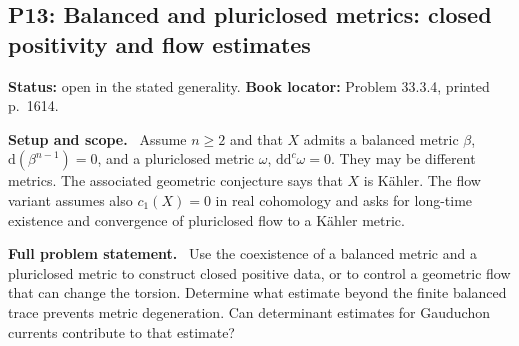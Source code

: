 \documentclass[11pt]{article}
\newcommand{\ddc}{\mathrm d\mathrm d^c}
\newcommand{\field}[1]{\par\medskip\noindent\textbf{#1.}\ }
\begin{document}
\subsection{P13: Balanced and pluriclosed metrics: closed positivity and flow estimates}
\label{P13}
\noindent\textbf{Status:} open in the stated generality. \textbf{Book locator:} Problem 33.3.4, printed p.~1614.
\field{Setup and scope} Assume $n\geq2$ and that $X$ admits a balanced metric $\beta$, $\mathrm d(\beta^{n-1})=0$, and a pluriclosed metric $\omega$, $\ddc\omega=0$. They may be different metrics. The associated geometric conjecture says that $X$ is K\"ahler. The flow variant assumes also $c_1(X)=0$ in real cohomology and asks for long-time existence and convergence of pluriclosed flow to a K\"ahler metric.
\field{Full problem statement} Use the coexistence of a balanced metric and a pluriclosed metric to construct closed positive data, or to control a geometric flow that can change the torsion. Determine what estimate beyond the finite balanced trace prevents metric degeneration. Can determinant estimates for Gauduchon currents contribute to that estimate?
\end{document}
